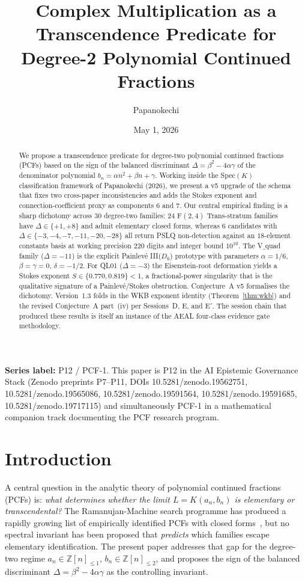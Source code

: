 \documentclass[12pt]{amsart}
\title[CM Predicate for Degree-2 PCFs]{Complex Multiplication as a Transcendence Predicate
for Degree-2 Polynomial Continued Fractions}
\author{Papanokechi}
\date{May 1, 2026}
\theoremstyle{definition}
\begin{document}
\begin{abstract}
We propose a transcendence predicate for degree-two polynomial continued
fractions (PCFs) based on the sign of the balanced discriminant
$\Delta=\beta^{2}-4\alpha\gamma$ of the denominator polynomial
$b_{n}=\alpha n^{2}+\beta n+\gamma$. Working inside the Spec$(K)$ classification
framework of Papanokechi (2026), we present a v5 upgrade of the schema that
fixes two cross-paper inconsistencies and adds the Stokes exponent and
connection-coefficient proxy as components 6 and 7. Our central empirical
finding is a sharp dichotomy across $30$ degree-two families: $24$ F$(2,4)$
Trans-stratum families have $\Delta\in\{+1,+8\}$ and admit elementary
closed forms, whereas $6$ candidates with $\Delta\in\{-3,-4,-7,-11,-20,-28\}$
all return PSLQ non-detection against an $18$-element constants basis at
working precision $220$ digits and integer bound $10^{10}$. The V$\_$quad
family ($\Delta=-11$) is the explicit Painlev\'e III($D_{6}$) prototype with
parameters $\alpha=1/6$, $\beta=\gamma=0$, $\delta=-1/2$. For QL01
($\Delta=-3$) the Eisenstein-root deformation yields a Stokes exponent
$S\in\{0.770,0.819\}<1$, a fractional-power singularity that is the
qualitative signature of a Painlev\'e/Stokes obstruction. Conjecture~A v5
formalises the dichotomy.
Version~1.3 folds in the WKB exponent identity (Theorem~\ref{thm:wkb})
and the revised Conjecture~A part~(iv) per Sessions~D, E, and E$'$.
The session chain that produced these results is
itself an instance of the AEAL four-class evidence gate methodology.
\end{abstract}

\maketitle

\noindent\textbf{Series label:} P12 / PCF-1.\;
This paper is P12 in the AI Epistemic Governance Stack
(Zenodo preprints P7--P11, DOIs 10.5281/zenodo.19562751,
10.5281/zenodo.19565086, 10.5281/zenodo.19591564, 10.5281/zenodo.19591685,
10.5281/zenodo.19717115) and simultaneously PCF-1 in a mathematical
companion track documenting the PCF research program.

\section{Introduction}\label{sec:intro}

A central question in the analytic theory of polynomial continued fractions
(PCFs) is: \emph{what determines whether the limit
$L=K(a_{n},b_{n})$ is elementary or transcendental?} The Ramanujan-Machine
search programme has produced a rapidly growing list of empirically
identified PCFs with closed forms~\cite{Raayoni2021}, but no
spectral invariant has been proposed that \emph{predicts} which families
escape elementary identification. The present paper addresses that gap for
the degree-two regime $a_{n}\in\mathbb{Z}[n]_{\le 1}$,
$b_{n}\in\mathbb{Z}[n]_{\le 2}$, and proposes the sign of the balanced
discriminant $\Delta=\beta^{2}-4\alpha\gamma$ as the controlling
invariant.
\end{document}
